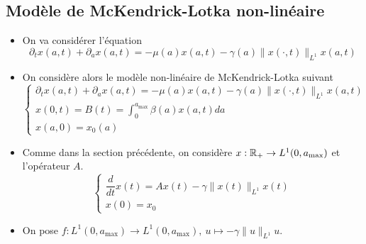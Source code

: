 \subsection{Modèle de McKendrick-Lotka non-linéaire}
\begin{frame}
    \begin{itemize}
        \item On va considérer l'équation 
        \begin{equation*}
            \partial_t x(a,t) + \partial_a x(a,t) = -\mu(a)x(a,t)-\gamma(a)\|x(\cdot,t)\|_{L^1}x(a,t)
        \end{equation*} \pause
        \item On considère alors le modèle non-linéaire de McKendrick-Lotka suivant
        \begin{equation*}
            \left\{\begin{array}{l}
                \partial_t x(a,t) + \partial_a x(a,t) = -\mu(a)x(a,t)-\gamma(a)\|x(\cdot,t)\|_{L^1}x(a,t) \\
                x(0,t) = B(t) = \displaystyle{\int_0^{a_{\max}}} \beta (a)x(a,t)d a \\
                x(a,0) = x_0(a)
            \end{array}\right.
        \end{equation*} \pause
        \item Comme dans la section précédente, on considère $x: \mathbb{R}_+ \rightarrow L^1(0,a_{\max})$ et l'opérateur $A$.
        \begin{equation*}
            \left\{\begin{array}{l}
                \dfrac{d}{d t}x(t) = Ax(t) -\gamma\|x(t)\|_{L^1}x(t) \\
                x(0) = x_0
            \end{array}\right.
        \end{equation*}\pause
        \item On pose $f : L^1(0,a_{\max}) \rightarrow L^1(0,a_{\max}), \ u \mapsto - \gamma \|u\|_{L^1}u$.
    \end{itemize}
\end{frame}

